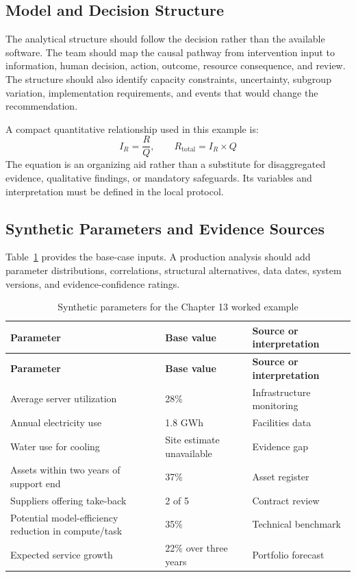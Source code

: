 \subsection{Model and Decision Structure}
The analytical structure should follow the decision rather than the available
software. The team should map the causal pathway from intervention input to
information, human decision, action, outcome, resource consequence, and review.
The structure should also identify capacity constraints, uncertainty, subgroup
variation, implementation requirements, and events that would change the
recommendation.

A compact quantitative relationship used in this example is:
\begin{equation}
I_R=\frac{R}{Q},\qquad R_{\mathrm{total}}=I_R\times Q
\label{eq:comp-ch13-key-relationship}
\end{equation}
The equation is an organizing aid rather than a substitute for disaggregated evidence,
qualitative findings, or mandatory safeguards. Its variables and interpretation must
be defined in the local protocol.

\subsection{Synthetic Parameters and Evidence Sources}
Table~\ref{tab:comp-ch13-parameters} provides the base-case inputs. A
production analysis should add parameter distributions, correlations, structural
alternatives, data dates, system versions, and evidence-confidence ratings.

\begin{longtable}{@{}p{}p{}p{}@{}}
\caption{Synthetic parameters for the Chapter 13 worked example}
\label{tab:comp-ch13-parameters}\\
\toprule
\textbf{Parameter} & \textbf{Base value} & \textbf{Source or interpretation} \\
\midrule
\endfirsthead
\toprule
\textbf{Parameter} & \textbf{Base value} & \textbf{Source or interpretation} \\
\midrule
\endhead
\bottomrule
\endlastfoot
Average server utilization & 28\% & Infrastructure monitoring \\
Annual electricity use & 1.8 GWh & Facilities data \\
Water use for cooling & Site estimate unavailable & Evidence gap \\
Assets within two years of support end & 37\% & Asset register \\
Suppliers offering take-back & 2 of 5 & Contract review \\
Potential model-efficiency reduction in compute/task & 35\% & Technical benchmark \\
Expected service growth & 22\% over three years & Portfolio forecast \\
\end{longtable}

